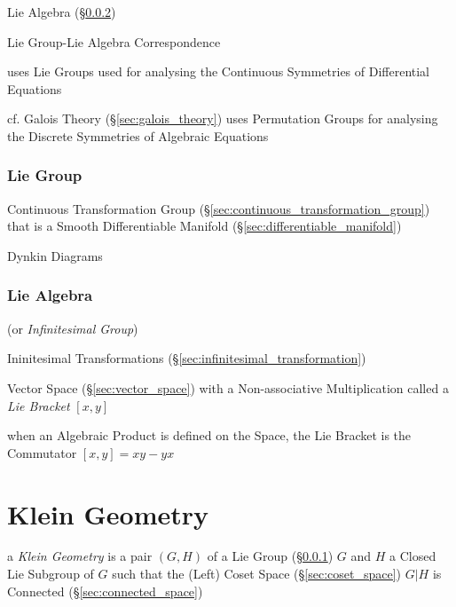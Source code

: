Lie Algebra (\S\ref{sec:lie_algebra})

Lie Group-Lie Algebra Correspondence

uses Lie Groups used for analysing the Continuous Symmetries of
Differential Equations %

cf. Galois Theory (\S\ref{sec:galois_theory}) uses Permutation Groups
for analysing the Discrete Symmetries of Algebraic Equations %



\subsubsection{Lie Group}\label{sec:lie_group}\hfill

Continuous Transformation Group
(\S\ref{sec:continuous_transformation_group}) that is a Smooth
Differentiable Manifold (\S\ref{sec:differentiable_manifold})

Dynkin Diagrams



\subsubsection{Lie Algebra}\label{sec:lie_algebra}

(or \emph{Infinitesimal Group})

Ininitesimal Transformations
(\S\ref{sec:infinitesimal_transformation})

Vector Space (\S\ref{sec:vector_space}) with a Non-associative
Multiplication called a \emph{Lie Bracket} $[x,y]$

when an Algebraic Product is defined on the Space, the Lie Bracket is
the Commutator $[x,y] = xy - yx$ %



\section{Klein Geometry}\label{sec:klein_geometry}


a \emph{Klein Geometry} is a pair $(G,H)$ of a Lie Group
(\S\ref{sec:lie_group}) $G$ and $H$ a Closed Lie Subgroup of $G$ such
that the (Left) Coset Space (\S\ref{sec:coset_space}) $G|H$ is
Connected (\S\ref{sec:connected_space})

